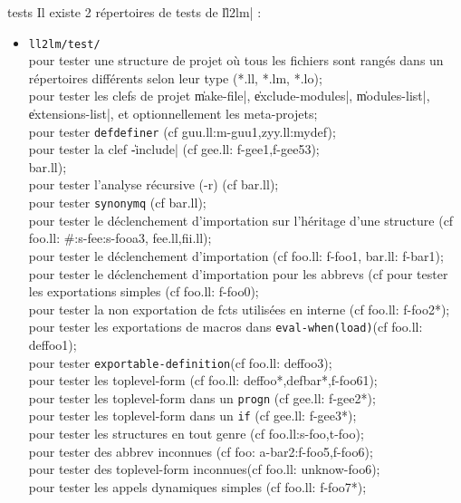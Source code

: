  {tests}
Il existe 2 r\'{e}pertoires de tests de \|ll2lm| : 
\begin{itemize}
\item{\tt ll2lm/test/} \\
pour tester une structure de projet o\`{u} tous les fichiers sont rang\'{e}s
dans un r\'{e}pertoires diff\'{e}rents selon leur type (*.ll, *.lm, *.lo);\\
pour tester les clefs de projet \|make-file|, \|exclude-modules|,
\|modules-list|, \|extensions-list|, et optionnellement les
meta-projets;\\
pour tester {\tt defdefiner} (cf guu.ll:m-guu1,zyy.ll:mydef);\\
pour tester la clef \|-include| (cf gee.ll: f-gee1,f-gee53);\\
bar.ll);\\
pour tester l'analyse r\'{e}cursive (-r) (cf bar.ll);\\
pour tester {\tt synonymq} (cf bar.ll);\\
pour tester le d\'{e}clenchement d'importation sur l'h\'{e}ritage d'une
structure (cf foo.ll: \#:s-fee:s-fooa3, fee.ll,fii.ll);\\
pour tester le d\'{e}clenchement d'importation (cf foo.ll: f-foo1,
bar.ll: f-bar1);\\ 
pour tester le d\'{e}clenchement d'importation pour les abbrevs (cf
pour tester les exportations simples (cf foo.ll: f-foo0);\\
pour tester la non exportation de fcts utilis\'{e}es en interne (cf
foo.ll: f-foo2*);\\
pour tester les exportations de macros dans {\tt eval-when(load)}(cf
foo.ll: deffoo1);\\
pour tester {\tt exportable-definition}(cf foo.ll: deffoo3);\\
pour tester les toplevel-form (cf foo.ll:
deffoo*,defbar*,f-foo61);\\ 
pour tester les toplevel-form dans un {\tt progn} (cf gee.ll: f-gee2*);\\
pour tester les toplevel-form dans un {\tt if} (cf gee.ll: f-gee3*);\\
pour tester les structures en tout genre (cf foo.ll:s-foo,t-foo);\\
pour tester des abbrev inconnues (cf foo: {a-bar2}:f-foo5,f-foo6);\\
pour tester des toplevel-form inconnues(cf foo.ll: unknow-foo6);\\
pour tester les appels dynamiques simples (cf foo.ll: f-foo7*);\\

\end{itemize}
